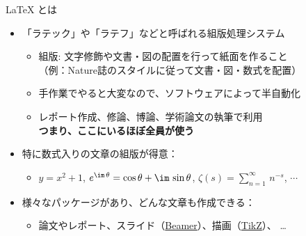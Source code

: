 \documentclass[dvipdfmx]{beamer}
\begin{document}
\begin{frame}[fragile]{\LaTeX{} とは}

    
\begin{itemize}
\item 「ラテック」や「ラテフ」などと呼ばれる組版処理システム
\begin{itemize}
    \item 組版: 文字修飾や文書・図の配置を行って紙面を作ること
    \\（例：Nature誌のスタイルに従って文書・図・数式を配置）
    \item 手作業でやると大変なので、ソフトウェアによって半自動化
    \item レポート作成、修論、博論、学術論文の執筆で利用
    \\\alert{\textbf{つまり、ここにいるほぼ全員が使う}}
\end{itemize}
%
\bigskip
\item 特に数式入りの文章の組版が得意：
    \begin{itemize}
        \item $y=x^2 + 1$, $e^{\im\,\theta} = \cos\theta + \im\,\sin\theta$, $\zeta(s) = \sum_{n=1}^\infty\,n^{-s}$, $\cdots$
    \end{itemize}
%
\bigskip
\item 様々なパッケージがあり、どんな文章も作成できる：
    \begin{itemize}
    \item 論文やレポート、スライド（\href{https://www.overleaf.com/learn/latex/Beamer}{Beamer}）、描画（\href{https://www.overleaf.com/learn/latex/TikZ_package}{TikZ}）、 \ldots
    \end{itemize}
\begin{center}
\qquad
{}
\end{center}
\end{itemize}
\end{frame}
\end{document}
